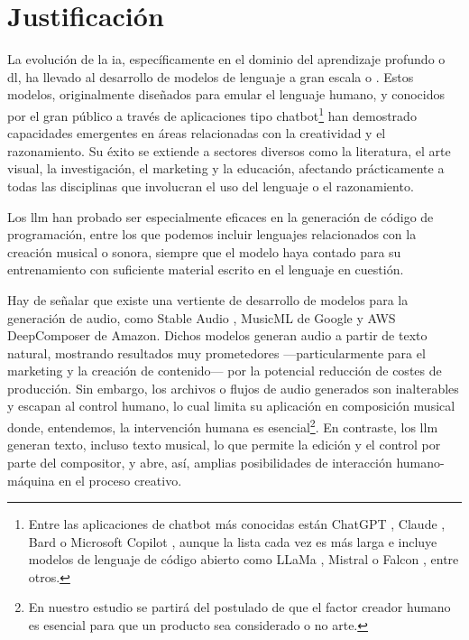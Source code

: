\section{Justificación}



La evolución de la \gls{ia}, específicamente en el dominio del aprendizaje profundo o \gls{dl}, ha llevado al desarrollo de {modelos de lenguaje a gran escala} o . Estos modelos, originalmente diseñados para emular el lenguaje humano, y conocidos por el gran público a través de aplicaciones tipo {chatbot}\footnote{Entre las aplicaciones de {chatbot} más conocidas están {ChatGPT} \citep{IntroducingChatGPT}, {Claude} \citep{IntroducingClaude}, {Bard} \citep{BardChatbot2024} o {Microsoft Copilot} \citep{mehdiAnnouncingMicrosoftCopilot2023}, aunque la lista cada vez es más larga e incluye modelos de lenguaje de código abierto como {LLaMa} \citep{touvronLLaMAOpenEfficient2023}, {Mistral} \citep{jiangMistral7B2023} o {Falcon} \citep{almazroueiFalconSeriesOpen2023}, entre otros.} han demostrado capacidades emergentes en áreas relacionadas con la creatividad y el razonamiento. Su éxito se extiende a sectores diversos como la literatura, el arte visual, la investigación, el marketing y la educación, afectando prácticamente a todas las disciplinas que involucran el uso del lenguaje o el razonamiento.

Los \gls{llm} han probado ser especialmente eficaces en la generación de código de programación, entre los que podemos incluir lenguajes relacionados con la creación musical o sonora, siempre que el modelo haya contado para su entrenamiento con suficiente material escrito en el lenguaje en cuestión.

Hay de señalar que existe una vertiente de desarrollo de modelos para la generación de audio, como {Stable Audio} \citep{Audio}, {MusicML} \citep{MusicLM} de Google y {AWS DeepComposer} \citep{CompositorMusicaIA} de Amazon. Dichos modelos generan audio a partir de texto natural, mostrando resultados muy prometedores ---particularmente para el marketing y la creación de contenido--- por la potencial reducción de costes de producción. Sin embargo, los archivos o flujos de audio generados son inalterables y escapan al control humano, lo cual limita su aplicación en composición musical donde, entendemos, la intervención humana es esencial\footnote{En nuestro estudio se partirá del postulado de que el factor creador humano es esencial para que un producto sea considerado o no arte.}. En contraste, los \gls{llm} generan texto, incluso texto musical, lo que permite la edición y el control por parte del compositor, y abre, así, amplias posibilidades de interacción humano-máquina en el proceso creativo.

